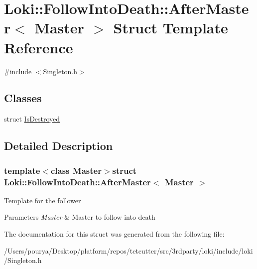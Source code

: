 \hypertarget{structLoki_1_1FollowIntoDeath_1_1AfterMaster}{}\section{Loki\+:\+:Follow\+Into\+Death\+:\+:After\+Master$<$ Master $>$ Struct Template Reference}
\label{structLoki_1_1FollowIntoDeath_1_1AfterMaster}


{\ttfamily \#include $<$Singleton.\+h$>$}

\subsection*{Classes}
\begin{DoxyCompactItemize}
\item 
struct \hyperlink{structLoki_1_1FollowIntoDeath_1_1AfterMaster_1_1IsDestroyed}{Is\+Destroyed}
\end{DoxyCompactItemize}


\subsection{Detailed Description}
\subsubsection*{template$<$class Master$>$struct Loki\+::\+Follow\+Into\+Death\+::\+After\+Master$<$ Master $>$}

Template for the follower 
\begin{DoxyParams}{Parameters}
{\em Master} & Master to follow into death \\
\hline
\end{DoxyParams}


The documentation for this struct was generated from the following file\+:\begin{DoxyCompactItemize}
\item 
/\+Users/pourya/\+Desktop/platform/repos/tetcutter/src/3rdparty/loki/include/loki/Singleton.\+h\end{DoxyCompactItemize}
